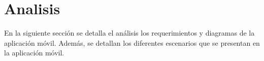 \chapter{Analisis } %
En la siguiente sección se detalla el análisis los requerimientos y diagramas de la aplicación móvil. Además, se detallan los diferentes escenarios que se presentan en la aplicación móvil. 
	